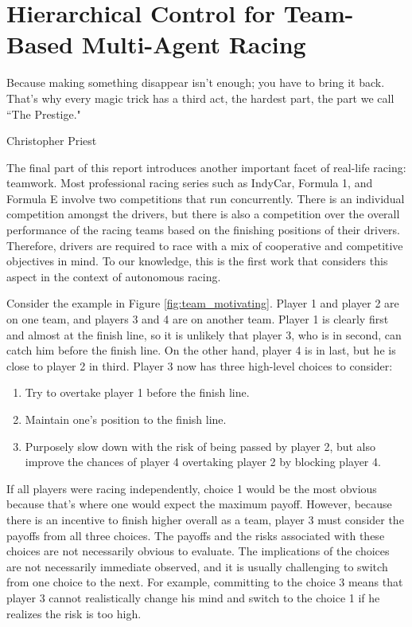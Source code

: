 \chapter{Hierarchical Control for Team-Based Multi-Agent Racing}
\epigraph{\flushright Because making something disappear isn't enough; you have to bring it back. That's why every magic trick has a third act, the hardest part, the part we call ``The Prestige."}{Christopher Priest}
\label{chapter:team}
The final part of this report introduces another important facet of real-life racing: teamwork. Most professional racing series such as IndyCar, Formula 1, and Formula E involve two competitions that run concurrently. There is an individual competition amongst the drivers, but there is also a competition over the overall performance of the racing teams based on the finishing positions of their drivers. Therefore, drivers are required to race with a mix of cooperative and competitive objectives in mind. To our knowledge, this is the first work that considers this aspect in the context of autonomous racing. 

Consider the example in Figure \ref{fig:team_motivating}. Player 1 and player 2 are on one team, and players 3 and 4 are on another team. Player 1 is clearly first and almost at the finish line, so it is unlikely that player 3, who is in second, can catch him before the finish line. On the other hand, player 4 is in last, but he is close to player 2 in third. Player 3 now has three high-level choices to consider:
\begin{enumerate}
    \item Try to overtake player 1 before the finish line.
    \item Maintain one's position to the finish line.
    \item Purposely slow down with the risk of being passed by player 2, but also improve the chances of player 4 overtaking player 2 by blocking player 4.
\end{enumerate}
If all players were racing independently, choice 1 would be the most obvious because that's where one would expect the maximum payoff. However, because there is an incentive to finish higher overall as a team, player 3 must consider the payoffs from all three choices. The payoffs and the risks associated with these choices are not necessarily obvious to evaluate. The implications of the choices are not necessarily immediate observed, and it is usually challenging to switch from one choice to the next. For example, committing to the choice 3 means that player 3 cannot realistically change his mind and switch to the choice 1 if he realizes the risk is too high. 

